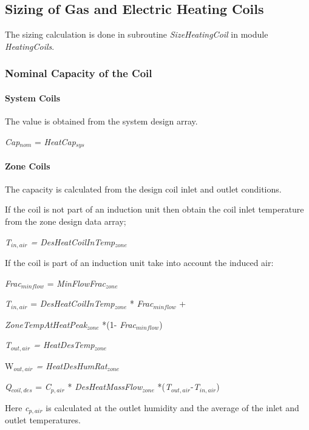 \subsection{Sizing of Gas and Electric Heating Coils}\label{sizing-of-gas-and-electric-heating-coils}

The sizing calculation is done in subroutine \emph{SizeHeatingCoil} in module \emph{HeatingCoils}.

\subsubsection{Nominal Capacity of the Coil}\label{nominal-capacity-of-the-coil}

\paragraph{System Coils}\label{system-coils-3}

The value is obtained from the system design array.

\emph{Cap\(_{nom}\)} = \emph{HeatCap\(_{sys}\)}

\paragraph{Zone Coils}\label{zone-coils-3}

The capacity is calculated from the design coil inlet and outlet conditions.

If the coil is not part of an induction unit then obtain the coil inlet temperature from the zone design data array;

\emph{T\(_{in,air}\) = DesHeatCoilInTemp\(_{zone}\)}

If the coil is part of an induction unit take into account the induced air:

\emph{Frac\(_{minflow}\)} = \emph{MinFlowFrac\(_{zone}\)}

\emph{T\(_{in,air}\)} = \emph{DesHeatCoilInTemp\(_{zone}\)} * \emph{Frac\(_{minflow}\)} +

\emph{ZoneTempAtHeatPeak\(_{zone}\)} *(1- \emph{Frac\(_{minflow}\)})

\emph{T\(_{out,air}\) = HeatDesTemp\(_{zone}\)}

W\emph{\(_{out,air}\) = HeatDesHumRat\(_{zone}\)}

\emph{Q\(_{coil,des}\)} = \emph{C\(_{p,air}\)} * \emph{DesHeatMassFlow\(_{zone}\)} *(\emph{T\(_{out,air}\)}-\emph{T\(_{in,air}\)})

Here \emph{c\(_{p,air}\)} is calculated at the outlet humidity and the average of the inlet and outlet temperatures.

